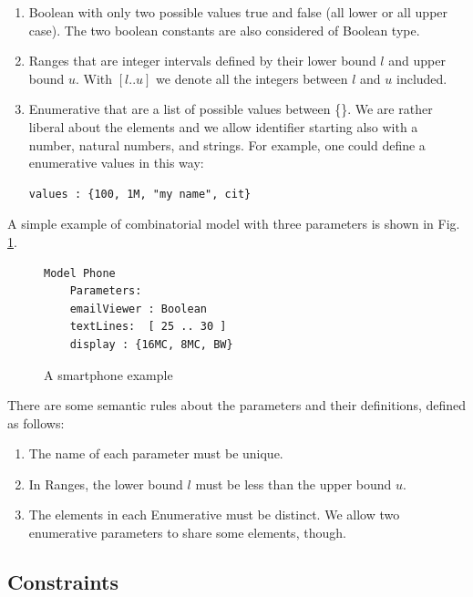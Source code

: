 \begin{tikzborder}{\cite{Gargantini16:validation}}
\begin{tikzborder}{\cite{gargantini_combinatorial_2017}}
\begin{tikzborder}{\cite{gargantini_combinatorial_2017}}
\begin{tikzborder}{\cite{garn2019}}
\begin{tikzborder}{\cite{arcaini2019achieving}}
\begin{tikzborder}{\cite{IWCTGargantini2018}}
\begin{enumerate}
	\item \textsf{Boolean} with only two possible values \textsf{true} and \textsf{false} (all lower or all upper case).
	The two boolean constants are also considered of Boolean type.
	\item \textsf{Ranges} that are integer intervals defined by their lower bound $l$ and upper bound $u$. With $[l..u]$ we denote all the integers between $l$ and $u$ included.
	\item \textsf{Enumerative} that are a list of possible values between \{\}. We are rather liberal about the elements and we allow identifier starting also with a number, natural numbers, and strings. For example, one could define a  enumerative \textsf{values} in this way:
	\begin{lstlisting}[language=ctwedge]
	values : {100, 1M, "my name", cit}
	\end{lstlisting}
\end{enumerate}

A simple example of combinatorial model with three parameters is shown in Fig. \ref{fig:ctexample}. 
\end{tikzborder}

\begin{figure}[htb]
	\centering
	\begin{lstlisting}[language=ctwedge,frame= single]
	Model Phone
	Parameters:
	emailViewer : Boolean
	textLines:  [ 25 .. 30 ]
	display : {16MC, 8MC, BW}
	\end{lstlisting}
	\caption{A smartphone example}
	\label{fig:ctexample}
\end{figure}

\begin{tikzborder}{}
There are some semantic rules about the parameters and their definitions, defined as follows:
\begin{enumerate}
	\item The name of each parameter must be unique.
	\item In \textsf{Ranges}, the lower bound $l$ must be less than the upper bound $u$.
	\item The elements in each \textsf{Enumerative} must be distinct. We allow two enumerative parameters to share some elements, though.
\end{enumerate}
\end{tikzborder}

\subsection{Constraints}


\end{tikzborder}
\end{tikzborder}
\end{tikzborder}
\end{tikzborder}
\end{tikzborder}
